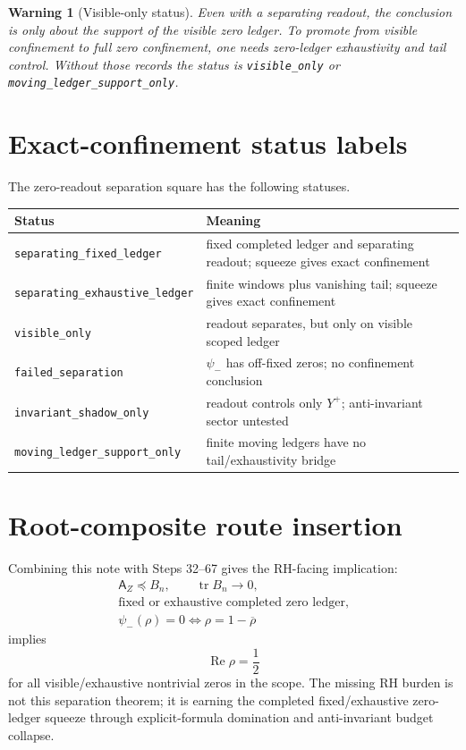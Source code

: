 \documentclass[11pt]{article}
\newtheorem{warning}[theorem]{Warning}
\newcommand{\Tr}{\operatorname{tr}}
\begin{document}
\begin{warning}[Visible-only status]
Even with a separating readout, the conclusion is only about the support of the visible zero ledger.  To promote from visible confinement to full zero confinement, one needs zero-ledger exhaustivity and tail control.  Without those records the status is \texttt{visible\_only} or \texttt{moving\_ledger\_support\_only}.
\end{warning}

\section{Exact-confinement status labels}
The zero-readout separation square has the following statuses.
\begin{center}
\begin{tabular}{ll}
\hline
Status & Meaning \\
\hline
\texttt{separating\_fixed\_ledger} & fixed completed ledger and separating readout; squeeze gives exact confinement \\
\texttt{separating\_exhaustive\_ledger} & finite windows plus vanishing tail; squeeze gives exact confinement \\
\texttt{visible\_only} & readout separates, but only on visible scoped ledger \\
\texttt{failed\_separation} & $\psi_-$ has off-fixed zeros; no confinement conclusion \\
\texttt{invariant\_shadow\_only} & readout controls only $Y^+$; anti-invariant sector untested \\
\texttt{moving\_ledger\_support\_only} & finite moving ledgers have no tail/exhaustivity bridge \\
\hline
\end{tabular}
\end{center}

\section{Root-composite route insertion}
Combining this note with Steps 32--67 gives the RH-facing implication:
\[
\begin{gathered}
  \mathsf A_Z\preceq B_n,
  \qquad \Tr B_n\to0, \\
  \text{fixed or exhaustive completed zero ledger}, \\
  \psi_-(\rho)=0\iff \rho=1-\overline{\rho}
\end{gathered}
\]
implies
\[
  \operatorname{Re}\rho=\frac12
\]
for all visible/exhaustive nontrivial zeros in the scope.  The missing RH burden is not this separation theorem; it is earning the completed fixed/exhaustive zero-ledger squeeze through explicit-formula domination and anti-invariant budget collapse.
\end{document}
